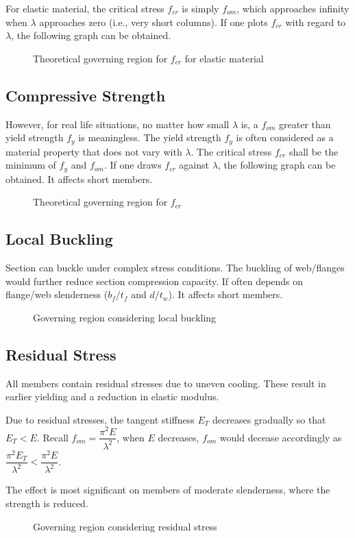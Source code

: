 For elastic material, the critical stress $f_{cr}$ is simply $f_{om}$, which approaches infinity when $\lambda$ approaches zero (i.e., very short columns). If one plots $f_{cr}$ with regard to $\lambda$, the following graph can be obtained.
\begin{figure}[H]
\centering
\caption{Theoretical governing region for $f_{cr}$ for elastic material}
\end{figure}
\subsection{Compressive Strength}
However, for real life situations, no matter how small $\lambda$ is, a $f_{om}$ greater than yield strength $f_y$ is meaningless. The yield strength $f_y$ is often considered as a material property that does not vary with $\lambda$. The critical stress $f_{cr}$ shall be the minimum of $f_y$ and $f_{om}$. If one draws $f_{cr}$ against $\lambda$, the following graph can be obtained. It affects short members.
\begin{figure}[H]
\centering
\caption{Theoretical governing region for $f_{cr}$}
\end{figure}
\subsection{Local Buckling}
Section can buckle under complex stress conditions. The buckling of web/flanges would further reduce section compression capacity. If often depends on flange/web slenderness ($b_f/t_f$ and $d/t_w$). It affects short members.
\begin{figure}[H]
\centering
\caption{Governing region considering local buckling}
\end{figure}
\subsection{Residual Stress}
All members contain residual stresses due to uneven cooling. These result in earlier yielding
and a reduction in elastic modulus.

Due to residual stresses, the tangent stiffness $E_T$ decreases gradually so that $E_T<E$. Recall $f_{om}=\dfrac{\pi^2E}{\lambda^2}$, when $E$ decreases, $f_{om}$ would decease accordingly as $\dfrac{\pi^2E_T}{\lambda^2}<\dfrac{\pi^2E}{\lambda^2}$.
\begin{figure}[H]
\centering
\end{figure}
The effect is most significant on members of moderate slenderness, where the strength is reduced.
\begin{figure}[H]
\centering
\caption{Governing region considering residual stress}
\end{figure}
